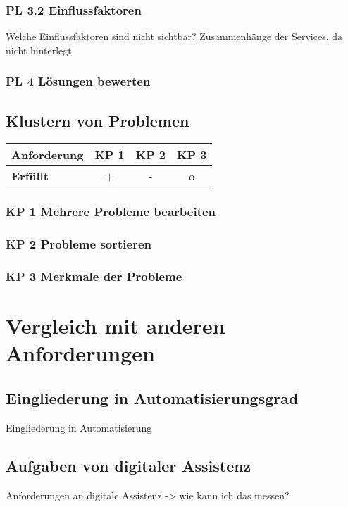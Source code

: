\subsubsection*{PL 3.2 Einflussfaktoren}
Welche Einflussfaktoren sind nicht sichtbar? Zusammenhänge der Services, da nicht hinterlegt

\subsubsection*{PL 4 Lösungen bewerten}

\subsection{Klustern von Problemen}
\begin{table}[htbp]
\centering
\begin{tabular}{l|c|c|c}
\textbf{Anforderung} & KP 1 & KP 2 & KP 3\\
\hline
\textbf{Erfüllt} & + & - & o\\
\end{tabular}
\end{table}

\subsubsection*{KP 1 Mehrere Probleme bearbeiten}

\subsubsection*{KP 2 Probleme sortieren}

\subsubsection*{KP 3 Merkmale der Probleme}

\section{Vergleich mit anderen Anforderungen}

\subsection*{Eingliederung in Automatisierungsgrad}
Eingliederung in Automatisierung

\subsection*{Aufgaben von digitaler Assistenz}
Anforderungen an digitale Assistenz -> wie kann ich das messen?

